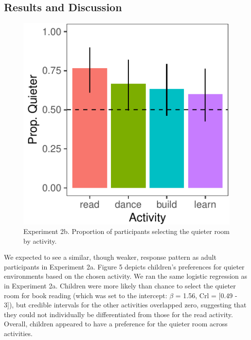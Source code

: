 \documentclass[10pt, letterpaper]{article}
\newenvironment{CodeChunk}{}{}
\begin{document}
\hypertarget{results-and-discussion-3}{%
\subsection{Results and Discussion}\label{results-and-discussion-3}}

\begin{CodeChunk}
\begin{figure}[t]

{\centering \includegraphics{figs/2b-bar-1} 

}

\caption[Experiment 2b]{Experiment 2b. Proportion of participants selecting the quieter room by activity.}\label{fig:2b-bar}
\end{figure}
\end{CodeChunk}

We expected to see a similar, though weaker, response pattern as adult
participants in Experiment 2a. Figure 5 depicts children's preferences
for quieter environments based on the chosen activity. We ran the same
logistic regression as in Experiment 2a. Children were more likely than
chance to select the quieter room for book reading (which was set to the
intercept: \(\beta\) = 1.56, Crl = {[}0.49 - 3{]}), but credible
intervals for the other activities overlapped zero, suggesting that they
could not individually be differentiated from those for the read
activity. Overall, children appeared to have a preference for the
quieter room across activities.
\end{document}
